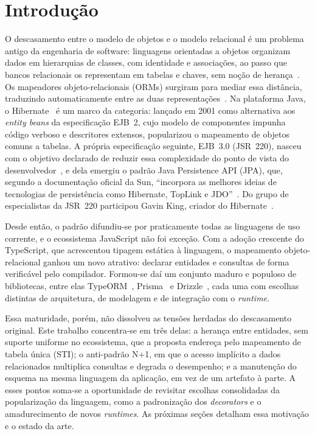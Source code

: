 \newpage
\section{Introdução}
\label{sc:introducao}

O descasamento entre o modelo de objetos e o modelo relacional é um problema antigo da engenharia de software: linguagens orientadas a objetos organizam dados em hierarquias de classes, com identidade e associações, ao passo que bancos relacionais os representam em tabelas e chaves, sem noção de herança~\cite[p.~62]{fowler}. Os mapeadores objeto-relacionais (ORMs) surgiram para mediar essa distância, traduzindo automaticamente entre as duas representações~\cite{hibernate}. Na plataforma Java, o Hibernate~\cite{bauer-king} é um marco da categoria: lançado em 2001 como alternativa aos \emph{entity beans} da especificação EJB~2, cujo modelo de componentes impunha código verboso e descritores extensos, popularizou o mapeamento de objetos comuns a tabelas. A própria especificação seguinte, EJB~3.0 (JSR~220), nasceu com o objetivo declarado de reduzir essa complexidade do ponto de vista do desenvolvedor~\cite{jsr220}, e dela emergiu o padrão Java Persistence API (JPA), que, segundo a documentação oficial da Sun, ``incorpora as melhores ideias de tecnologias de persistência como Hibernate, TopLink e JDO''~\cite{jpa-faq}. Do grupo de especialistas da JSR~220 participou Gavin King, criador do Hibernate~\cite{jcp-king}.

Desde então, o padrão difundiu-se por praticamente todas as linguagens de uso corrente, e o ecossistema JavaScript não foi exceção. Com a adoção crescente do TypeScript, que acrescentou tipagem estática à linguagem, o mapeamento objeto-relacional ganhou um novo atrativo: declarar entidades e consultas de forma verificável pelo compilador. Formou-se daí um conjunto maduro e populoso de bibliotecas, entre elas TypeORM~\cite{typeorm}, Prisma~\cite{prisma} e Drizzle~\cite{drizzle}, cada uma com escolhas distintas de arquitetura, de modelagem e de integração com o \emph{runtime}.

Essa maturidade, porém, não dissolveu as tensões herdadas do descasamento original. Este trabalho concentra-se em três delas: a herança entre entidades, sem suporte uniforme no ecossistema, que a proposta endereça pelo mapeamento de tabela única (STI); o anti-padrão N+1, em que o acesso implícito a dados relacionados multiplica consultas e degrada o desempenho; e a manutenção do esquema na mesma linguagem da aplicação, em vez de um artefato à parte. A esses pontos soma-se a oportunidade de revisitar escolhas consolidadas da popularização da linguagem, como a padronização dos \emph{decorators} e o amadurecimento de novos \emph{runtimes}. As próximas seções detalham essa motivação e o estado da arte.
